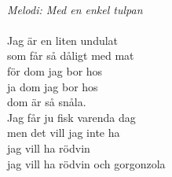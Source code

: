 \\
{\footnotesize\textit{Melodi: Med en enkel tulpan}}\\
\\
Jag är en liten undulat\\
som får så dåligt med mat\\
för dom jag bor hos\\
ja dom jag bor hos\\
dom är så snåla.\\
Jag får ju fisk varenda dag\\
men det vill jag inte ha\\
jag vill ha rödvin\\
jag vill ha rödvin och gorgonzola

